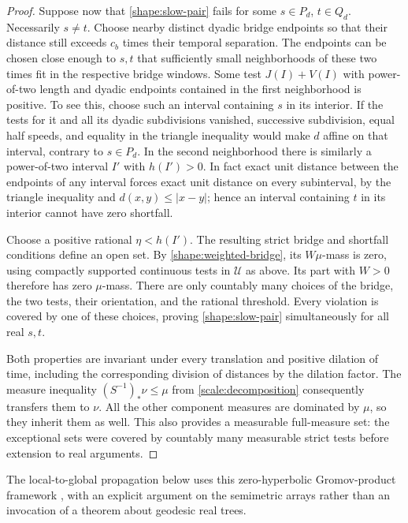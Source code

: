 \begin{proof}
Suppose now that \cref{shape:slow-pair} fails for some $s\in P_d$,
$t\in Q_d$.  Necessarily $s\ne t$.  Choose nearby distinct dyadic bridge
endpoints so that their distance still exceeds $c_b$ times their temporal
separation.  The endpoints can be chosen close enough to $s,t$ that
sufficiently small neighborhoods of these two times fit in the respective
bridge windows.  Some test $J(I)+V(I)$ with power-of-two length and dyadic
endpoints contained in the first neighborhood is positive.  To see this,
choose such an interval containing $s$ in its interior.  If the tests for
it and all its dyadic subdivisions vanished, successive subdivision,
equal half speeds, and equality in the triangle inequality would make
$d$ affine on that interval, contrary to $s\in P_d$.  In the second
neighborhood there is similarly a power-of-two interval $I'$ with
$h(I')>0$.  In fact exact unit distance between the endpoints of any
interval forces exact unit distance on every subinterval, by the triangle
inequality and $d(x,y)\le|x-y|$; hence an interval containing $t$ in its
interior cannot have zero shortfall.

Choose a positive rational $\eta<h(I')$.  The resulting strict bridge
and shortfall conditions define an open set.  By
\cref{shape:weighted-bridge}, its $W\mu$-mass is zero, using compactly
supported continuous tests in $\mathcal U$ as above.  Its part with $W>0$
therefore has zero $\mu$-mass.  There are only countably many choices of
the bridge, the two tests, their orientation, and the rational threshold.
Every violation is covered by one of these choices, proving
\cref{shape:slow-pair} simultaneously for all real $s,t$.

Both properties are invariant under every translation and positive
dilation of time, including the corresponding division of distances by
the dilation factor.  The measure inequality
$(S^{-1})_*\nu\le\mu$ from \cref{scale:decomposition} consequently transfers
them to $\nu$.  All the other component measures are dominated by $\mu$,
so they inherit them as well.  This also provides a measurable full-measure
set: the exceptional sets were covered by countably many measurable
strict tests before extension to real arguments.
\end{proof}

The local-to-global propagation below uses this zero-hyperbolic
Gromov-product framework \cite[Section~2.2]{Bestvina1997}, with an
explicit argument on the semimetric arrays rather than an invocation
of a theorem about geodesic real trees.

